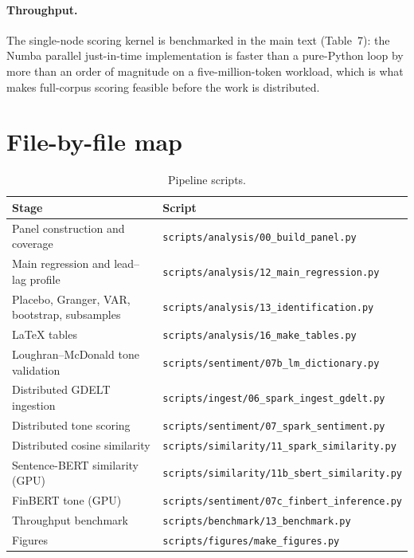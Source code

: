 \documentclass[11pt,a4paper]{article}
\begin{document}
\paragraph{Throughput.} The single-node scoring kernel is benchmarked in the main
text (Table~7): the Numba parallel just-in-time implementation is faster than a
pure-Python loop by more than an order of magnitude on a five-million-token
workload, which is what makes full-corpus scoring feasible before the work is
distributed.

\section{File-by-file map}

\begin{table}[h]
\centering
\caption{Pipeline scripts.}
\footnotesize
\begin{tabular}{p{6.2cm}p{8.2cm}}
\toprule
Stage & Script \\
\midrule
Panel construction and coverage & \texttt{scripts/analysis/00\_build\_panel.py} \\
Main regression and lead--lag profile & \texttt{scripts/analysis/12\_main\_regression.py} \\
Placebo, Granger, VAR, bootstrap, subsamples & \texttt{scripts/analysis/13\_identification.py} \\
LaTeX tables & \texttt{scripts/analysis/16\_make\_tables.py} \\
Loughran--McDonald tone validation & \texttt{scripts/sentiment/07b\_lm\_dictionary.py} \\
Distributed GDELT ingestion & \texttt{scripts/ingest/06\_spark\_ingest\_gdelt.py} \\
Distributed tone scoring & \texttt{scripts/sentiment/07\_spark\_sentiment.py} \\
Distributed cosine similarity & \texttt{scripts/similarity/11\_spark\_similarity.py} \\
Sentence-BERT similarity (GPU) & \texttt{scripts/similarity/11b\_sbert\_similarity.py} \\
FinBERT tone (GPU) & \texttt{scripts/sentiment/07c\_finbert\_inference.py} \\
Throughput benchmark & \texttt{scripts/benchmark/13\_benchmark.py} \\
Figures & \texttt{scripts/figures/make\_figures.py} \\
\bottomrule
\end{tabular}
\end{table}
\end{document}
